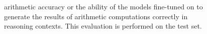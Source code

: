 \begin{figure}[t]
    \centering
    \resizebox{\linewidth}{!}{
        \Large\ttfamily
        
    }
    \caption{\gsm{} arithmetic accuracy or the ability of the models fine-tuned on \gsm{} to generate the results of arithmetic computations correctly in reasoning contexts. This evaluation is performed on the \gsm{} test set.}
    \label{fig:gsm8k_arith_perf}
\end{figure}
